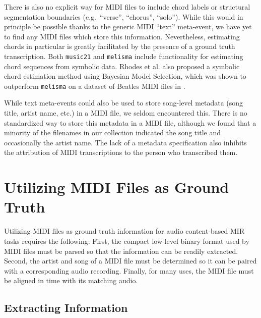 There is also no explicit way for MIDI files to include chord labels or structural segmentation boundaries (e.g.\ ``verse'', ``chorus'', ``solo'').
While this would in principle be possible thanks to the generic MIDI ``text'' meta-event, we have yet to find any MIDI files which store this information.
Nevertheless, estimating chords in particular is greatly facilitated by the presence of a ground truth transcription.
Both \texttt{music21} \cite{cuthbert2010music21} and \texttt{melisma} \cite{sleator2001melisma} include functionality for estimating chord sequences from symbolic data.
Rhodes et al.\cite{rhodes2007bayesian} also proposed a symbolic chord estimation method using Bayesian Model Selection, which was shown to outperform \texttt{melisma} on a dataset of Beatles MIDI files in \cite{ewert2012towards}.

While text meta-events could also be used to store song-level metadata (song title, artist name, etc.) in a MIDI file, we seldom encountered this.
There is no standardized way to store this metadata in a MIDI file, although we found that a minority of the filenames in our collection indicated the song title and occasionally the artist name.
The lack of a metadata specification also inhibits the attribution of MIDI transcriptions to the person who transcribed them.

\section{Utilizing MIDI Files as Ground Truth}
\label{sec:utilizing}

Utilizing MIDI files as ground truth information for audio content-based MIR tasks requires the following:
First, the compact low-level binary format used by MIDI files must be parsed so that the information can be readily extracted.
Second, the artist and song of a MIDI file must be determined so it can be paired with a corresponding audio recording.
Finally, for many uses, the MIDI file must be aligned in time with its matching audio.

\subsection{Extracting Information}

